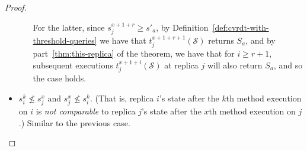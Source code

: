 \begin{proof}
\begin{itemize}
\begin{itemize}
For the latter, since $s^{x+1+r}_j \geq s'_a$, by
Definition~\ref{def:cvrdt-with-threshold-queries} we have that
$t^{x+1+r+1}_j(\mathcal{S})$ returns $S_a$, and by
part~\ref{thm:this-replica} of the theorem, we have that for $i \geq
r+1$, subsequent executions $t^{x+1+i}_j(\mathcal{S})$ at replica $j$
will also return $S_a$, and so the case holds.
\end{itemize}

\item $s^k_i \nleq s^x_j$ and $s^x_j \nleq s^k_i$.
(That is, replica $i$'s state after the $k$th method execution on $i$
is \emph{not comparable} to replica $j$'s state after the $x$th method
execution on $j$.)  Similar to the previous case.
\end{itemize}
\end{proof}
